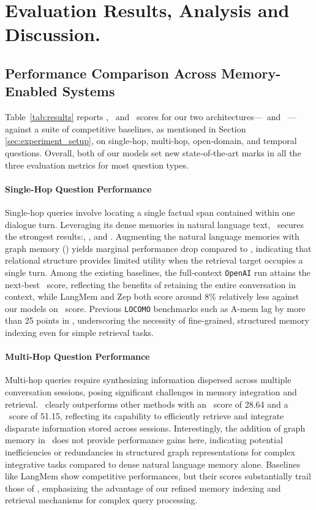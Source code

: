 \section{Evaluation Results, Analysis and Discussion.}

\subsection{Performance Comparison Across Memory-Enabled Systems}
Table~\ref{tab:results} reports \Fone, \Bone~and \Judge~scores for our two architectures—\mem~and \memp~—against a suite of competitive baselines, as mentioned in Section \ref{sec:experiment_setup}, on single‑hop, multi‑hop, open‑domain, and temporal questions. Overall, both of our models set new state‑of‑the‑art marks in all the three evaluation metrics for most question types.


\paragraph{Single-Hop Question Performance} Single‑hop queries involve locating a single factual span contained within one dialogue turn. Leveraging its dense memories in natural language text, \mem~secures the strongest results:, , and . Augmenting the natural language memories with graph memory (\memp) yields marginal performance drop compared to \mem, indicating that relational structure provides limited utility when the retrieval target occupies a single turn. Among the existing baselines, the full‑context \texttt{OpenAI} run attains the next‑best \Judge\ score, reflecting the benefits of retaining the entire conversation in context, while LangMem and Zep both score around 8\% relatively less against our models on \Judge~score. Previous \texttt{LOCOMO} benchmarks such as A-mem lag by more than 25 points in \Judge, underscoring the necessity of fine‑grained, structured memory indexing even for simple retrieval tasks.

\paragraph{Multi-Hop Question Performance}
Multi-hop queries require synthesizing information dispersed across multiple conversation sessions, posing significant challenges in memory integration and retrieval. \mem~clearly outperforms other methods with an \Fone~score of 28.64 and a \Judge~score of 51.15, reflecting its capability to efficiently retrieve and integrate disparate information stored across sessions. Interestingly, the addition of graph memory in \memp~does not provide performance gains here, indicating potential inefficiencies or redundancies in structured graph representations for complex integrative tasks compared to dense natural language memory alone. Baselines like LangMem show competitive performances, but their scores substantially trail those of \mem, emphasizing the advantage of our refined memory indexing and retrieval mechanisms for complex query processing.

